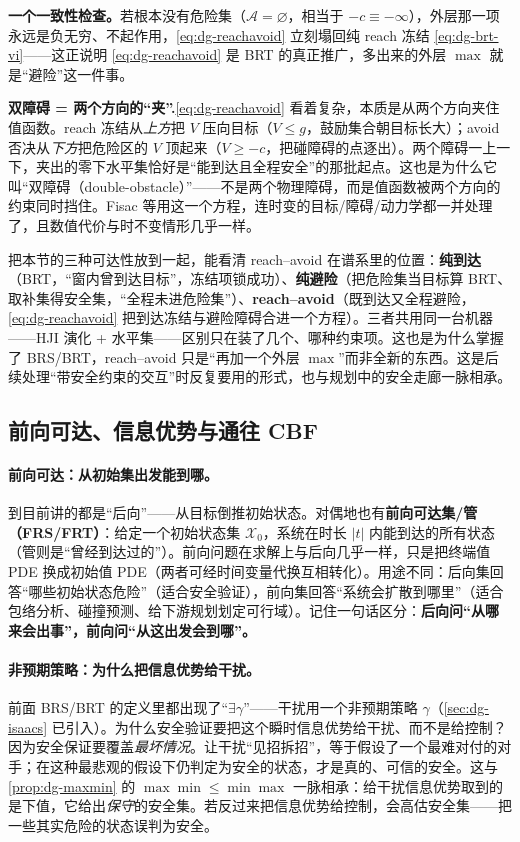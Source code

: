 \textbf{一个一致性检查。}\;若根本没有危险集（$\mathcal{A}=\varnothing$，相当于 $-c\equiv-\infty$），外层那一项永远是负无穷、不起作用，\cref{eq:dg-reachavoid} 立刻塌回纯 reach 冻结 \cref{eq:dg-brt-vi}——这正说明 \cref{eq:dg-reachavoid} 是 BRT 的真正推广，多出来的外层 $\max$ 就是“避险”这一件事。

\begin{insight}
\textbf{双障碍 = 两个方向的“夹”.}\;\cref{eq:dg-reachavoid} 看着复杂，本质是从两个方向夹住值函数。reach 冻结从\emph{上方}把 $V$ 压向目标（$V\le g$，鼓励集合朝目标长大）；avoid 否决从\emph{下方}把危险区的 $V$ 顶起来（$V\ge-c$，把碰障碍的点逐出）。两个障碍一上一下，夹出的零下水平集恰好是“能到达且全程安全”的那批起点。这也是为什么它叫“双障碍（double-obstacle）”——不是两个物理障碍，而是值函数被两个方向的约束同时挡住。Fisac 等用这一个方程，连时变的目标/障碍/动力学都一并处理了，且数值代价与时不变情形几乎一样。
\end{insight}

把本节的三种可达性放到一起，能看清 reach--avoid 在谱系里的位置：\textbf{纯到达}（BRT，“窗内曾到达目标”，冻结项锁成功）、\textbf{纯避险}（把危险集当目标算 BRT、取补集得安全集，“全程未进危险集”）、\textbf{reach--avoid}（既到达又全程避险，\cref{eq:dg-reachavoid} 把到达冻结与避险障碍合进一个方程）。三者共用同一台机器——HJI 演化 + 水平集——区别只在装了几个、哪种约束项。这也是为什么掌握了 BRS/BRT，reach--avoid 只是“再加一个外层 $\max$”而非全新的东西。这是后续处理“带安全约束的交互”时反复要用的形式，也与规划中的安全走廊一脉相承。

\subsection{前向可达、信息优势与通往 CBF}
\label{sec:dg-frs-cbf}
\paragraph{前向可达：从初始集出发能到哪。}
到目前讲的都是“后向”——从目标倒推初始状态。对偶地也有\textbf{前向可达集/管（FRS/FRT）}：给定一个初始状态集 $\mathcal{X}_0$，系统在时长 $|t|$ 内能到达的所有状态（管则是“曾经到达过的”）。前向问题在求解上与后向几乎一样，只是把终端值 PDE 换成初始值 PDE（两者可经时间变量代换互相转化）。用途不同：后向集回答“哪些初始状态危险”（适合安全验证），前向集回答“系统会扩散到哪里”（适合包络分析、碰撞预测、给下游规划划定可行域）。记住一句话区分：\textbf{后向问“从哪来会出事”，前向问“从这出发会到哪”。}

\paragraph{非预期策略：为什么把信息优势给干扰。}
前面 BRS/BRT 的定义里都出现了“$\exists\gamma$”——干扰用一个非预期策略 $\gamma$（\cref{sec:dg-isaacs} 已引入）。为什么安全验证要把这个瞬时信息优势给干扰、而不是给控制？因为安全保证要覆盖\emph{最坏情况}。让干扰“见招拆招”，等于假设了一个最难对付的对手；在这种最悲观的假设下仍判定为安全的状态，才是真的、可信的安全。这与 \cref{prop:dg-maxmin} 的 $\max\min\le\min\max$ 一脉相承：给干扰信息优势取到的是下值，它给出\emph{保守}的安全集。若反过来把信息优势给控制，会高估安全集——把一些其实危险的状态误判为安全。

